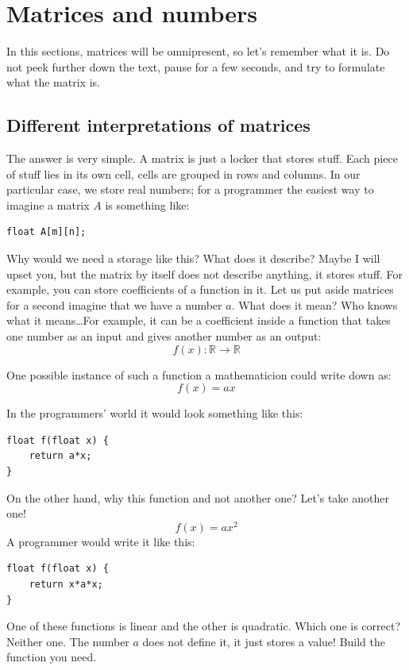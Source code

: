 \documentclass[notitlepage,oneside]{book}
\begin{document}
\section{Matrices and numbers}
In this sections, matrices will be omnipresent, so let's remember what it is.
Do not peek further down the text, pause for a few seconds, and try to formulate what the matrix is.

\subsection{Different interpretations of matrices}

The answer is very simple. A matrix is just a locker that stores stuff.
Each piece of stuff lies in its own cell, cells are grouped in rows and columns.
In our particular case, we store real numbers; for a programmer the easiest way to imagine a matrix $A$ is something like:
\begin{verbatim}
float A[m][n];
\end{verbatim}

Why would we need a storage like this? What does it describe?
Maybe I will upset you, but the matrix by itself does not describe anything, it stores stuff.
For example, you can store coefficients of a function in it.
Let us put aside matrices for a second imagine that we have a number $a$. What does it mean?
Who knows what it means\dots For example, it can be a coefficient inside a function that takes one number as an input and gives another number as an output:
$$
f(x) : \mathbb R \rightarrow \mathbb R
$$

One possible instance of such a function a mathematicion could write down as:
$$
f(x) = ax
$$

In the programmers' world it would look something like this:
\begin{verbatim}
float f(float x) {
    return a*x;
}
\end{verbatim}

On the other hand, why this function and not another one? Let's take another one!
$$
f(x) = ax^2
$$
A programmer would write it like this:
\begin{verbatim}
float f(float x) {
    return x*a*x;
}
\end{verbatim}

One of these functions is linear and the other is quadratic. Which one is correct? 
Neither one. The number $a$ does not define it, it just stores a value! 
Build the function you need.
\end{document}
